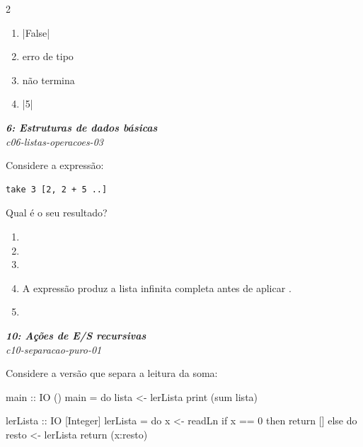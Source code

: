 \documentclass[a4paper,10pt,brazil]{article}
\begin{document}
\begin{multicols}{2}
\begin{enumerate}
  \item \haskellinline|False|

  \item erro de tipo

  \item não termina

  \item \haskellinline|5|


\end{enumerate}

\begin{flushright}
  \footnotesize
  \textit{\textbf{6: Estruturas de dados básicas}}\\
  \textit{c06-listas-operacoes-03}\\

\end{flushright}
Considere a expressão:
\begin{verbatim}
take 3 [2, 2 + 5 ..]
\end{verbatim}
Qual é o seu resultado?

\begin{enumerate}
  \item \haskellinline{ [2,7,12] }

  \item \haskellinline{ [2,5,10] }

  \item \haskellinline{ [7,12,17] }

  \item A expressão produz a lista infinita completa antes de aplicar .

  \item \haskellinline{ [2,7] }


\end{enumerate}

\begin{flushright}
  \footnotesize
  \textit{\textbf{10: Ações de E/S recursivas}}\\
  \textit{c10-separacao-puro-01}\\

\end{flushright}
Considere a versão que separa a leitura da soma:

\begin{haskellcode}
main :: IO ()
main = do
  lista <- lerLista
  print (sum lista)

lerLista :: IO [Integer]
lerLista = do
  x <- readLn
  if x == 0
    then return []
    else do
      resto <- lerLista
      return (x:resto)
\end{haskellcode}


\end{multicols}
\end{document}
